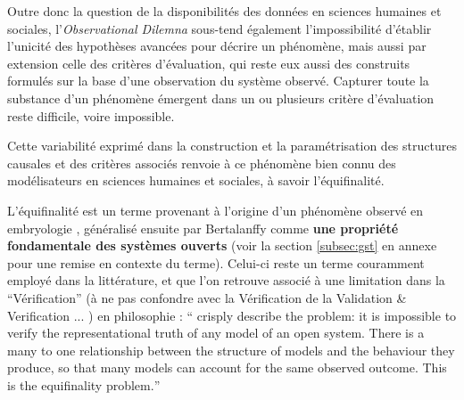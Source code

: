 Outre donc la question de la disponibilités des données en sciences humaines et sociales, l'\textit{Observational Dilemna} sous-tend également l'impossibilité d'établir l'unicité des hypothèses avancées pour décrire un phénomène, mais aussi par extension celle des critères d'évaluation, qui reste eux aussi des construits formulés sur la base d'une observation du système observé. Capturer toute la substance d'un phénomène émergent dans un ou plusieurs critère d'évaluation reste difficile, voire impossible.

Cette variabilité exprimé dans la construction et la paramétrisation des structures causales et des critères associés renvoie à ce phénomène bien connu des modélisateurs en sciences humaines et sociales, à savoir l'équifinalité.

L'équifinalité est un terme provenant à l'origine d'un phénomène observé en embryologie , généralisé ensuite par Bertalanffy comme \textbf{une propriété fondamentale des systèmes ouverts} (voir la section \ref{subsec:gst} en annexe pour une remise en contexte du terme). Celui-ci reste un terme couramment employé dans la littérature, et que l'on retrouve associé à une limitation dans la \enquote{Vérification} (à ne pas confondre avec la Vérification de la Validation \& Verification ... \autocite{David2009})  en philosophie : \foreignquote{english}{\textcite{Oreske1994} crisply describe the problem: it is impossible to verify the representational truth of any model of an open system. There is a many to one relationship between the structure of models and the behaviour they produce, so that many models can account for the same observed outcome. This is the equifinality problem.} \autocite{OSullivan2004}



